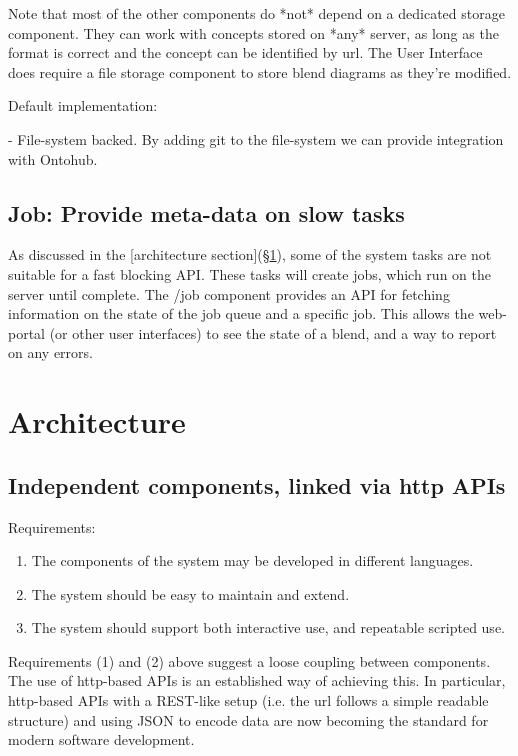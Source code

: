 \documentclass[10pt]{article}
\begin{document}
Note that most of the other components do *not* depend on a dedicated storage component. They can work with concepts stored on *any* server, as long as the format is correct and the concept can be identified by url. The User Interface does require a file storage component to store blend diagrams as they're modified.

Default implementation: 

 - File-system backed. By adding git to the file-system we can provide integration with Ontohub.


\subsection{Job: Provide meta-data on slow tasks}

As discussed in the [architecture section](\S\ref{sec:architecture}), some of the system tasks are not suitable for
a fast blocking API. These tasks will create jobs, which run on the server until complete.
The /job component provides an API for fetching information on the state of the job queue and a specific job. This allows the web-portal (or other user interfaces) to see the state of a blend, and a way to
report on any errors.


\section{Architecture}\label{sec:architecture}

\subsection{Independent components, linked via http APIs}

Requirements:  
\begin{enumerate}
\item The components of the system may be developed in different languages.
\item The system should be easy to maintain and extend.
\item The system should support both interactive use, and repeatable scripted use.
\end{enumerate}
Requirements (1) and (2) above suggest a loose coupling between components. The use of http-based APIs is an established way of achieving this. In particular, http-based APIs with a REST-like setup (i.e. the url follows a simple readable structure) and using JSON to encode data are now becoming the standard for modern software development. 
\end{document}
